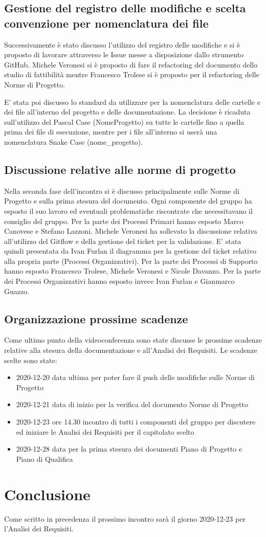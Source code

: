 \subsection{Gestione del registro delle modifiche e scelta convenzione per nomenclatura dei file}
Successivamente è stato discusso l'utilizzo del registro delle modifiche e si è proposto di lavorare attraverso le Issue messe a disposizione dallo strumento GitHub. Michele Veronesi si è proposto di fare il refactoring del documento  dello studio di fattibilità mentre Francesco Trolese si è proposto per il refactoring delle Norme di Progetto. 

E' stata poi discusso lo standard da utilizzare per la nomenclatura delle cartelle e dei file all'interno del progetto e delle documentazione. La decisione è ricaduta sull'utilizzo del Pascal Case (NomeProgetto) su tutte le cartelle fino a quella prima dei file di esecuzione, mentre per i file all'interno si userà una nomenclatura Snake Case (nome\_progetto).

\subsection{Discussione relative alle norme di progetto}
Nella seconda fase dell'incontro si è discusso principalmente sulle Norme di Progetto e sulla prima stesura del documento. Ogni componente del gruppo ha esposto il suo lavoro ed eventuali problematiche riscontrate che necessitavano il consiglio del gruppo. Per la parte dei Processi Primari hanno esposto Marco Canovese e Stefano Lazzoni. Michele Veronesi ha sollevato la discussione relativa all'utilizzo del Gitflow e della gestione del ticket per la validazione. E' stata quindi presentata da Ivan Furlan il diagramma per la gestione del ticket relativo alla propria parte (Processi Organizzativi). Per la parte dei Processi di Supporto hanno esposto Francesco Trolese, Michele Veronesi e Nicole Davanzo. Per la parte dei Processi Organizzativi hanno esposto invece Ivan Furlan e Gianmarco Guazzo.

\subsection{Organizzazione prossime scadenze}
Come ultimo punto della videoconferenza sono state discusse le prossime scadenze relative alla stesura della documentazione e all'Analisi dei Requisiti. Le scadenze scelte sono state:
\begin{itemize}
	\item 2020-12-20 data ultima per poter fare il push delle modifiche sulle Norme di Progetto
	\item 2020-12-21 data di inizio per la verifica del documento Norme di Progetto 
	\item 2020-12-23 ore 14.30 incontro di tutti i componenti del gruppo per discutere ed iniziare le Analisi dei Requisiti per il capitolato scelto
	\item 2020-12-28 data per la prima stesura dei documenti Piano di Progetto e Piano di Qualifica
\end{itemize}

\section{Conclusione}
Come scritto in precedenza il prossimo incontro sarà il giorno 2020-12-23 per l'Analisi dei Requisiti.
